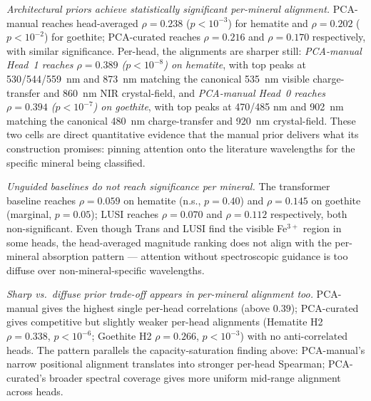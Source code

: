 \documentclass[preprint,12pt]{elsarticle}
\begin{document}
\emph{Architectural priors achieve statistically significant per-mineral alignment.}
PCA-manual reaches head-averaged $\rho = 0.238$ ($p < 10^{-3}$) for hematite and $\rho = 0.202$ ($p < 10^{-2}$) for goethite; PCA-curated reaches $\rho = 0.216$ and $\rho = 0.170$ respectively, with similar significance. Per-head, the alignments are sharper still: \emph{PCA-manual Head~1 reaches $\rho = 0.389$ ($p < 10^{-8}$) on hematite}, with top peaks at 530/544/559~nm and 873~nm matching the canonical 535~nm visible charge-transfer and 860~nm NIR crystal-field, and \emph{PCA-manual Head~0 reaches $\rho = 0.394$ ($p < 10^{-7}$) on goethite}, with top peaks at 470/485 nm and 902~nm matching the canonical 480~nm charge-transfer and 920~nm crystal-field. These two cells are direct quantitative evidence that the manual prior delivers what its construction promises: pinning attention onto the literature wavelengths for the specific mineral being classified.

\emph{Unguided baselines do not reach significance per mineral.}
The transformer baseline reaches $\rho = 0.059$ on hematite (n.s., $p = 0.40$) and $\rho = 0.145$ on goethite (marginal, $p = 0.05$); LUSI reaches $\rho = 0.070$ and $\rho = 0.112$ respectively, both non-significant. Even though Trans and LUSI find the visible Fe$^{3+}$ region in some heads, the head-averaged magnitude ranking does not align with the per-mineral absorption pattern --- attention without spectroscopic guidance is too diffuse over non-mineral-specific wavelengths.

\emph{Sharp vs.\ diffuse prior trade-off appears in per-mineral alignment too.}
PCA-manual gives the highest single per-head correlations (above $0.39$); PCA-curated gives competitive but slightly weaker per-head alignments (Hematite H2 $\rho = 0.338$, $p < 10^{-6}$; Goethite H2 $\rho = 0.266$, $p < 10^{-3}$) with no anti-correlated heads. The pattern parallels the capacity-saturation finding above: PCA-manual's narrow positional alignment translates into stronger per-head Spearman; PCA-curated's broader spectral coverage gives more uniform mid-range alignment across heads.
\end{document}
